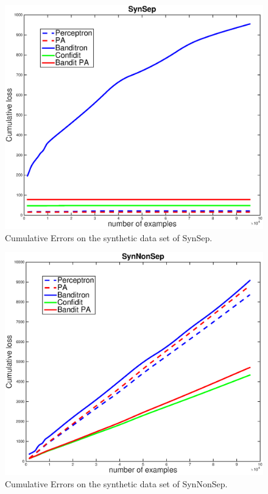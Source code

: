 \begin{figure}[h!]

\centerline{
\includegraphics[scale = 0.4]{fig05/mc/SynSep.eps}
}
\caption{Cumulative Errors on the synthetic data set of  SynSep.}
\label{pic:BPASS}
\end{figure}
\begin{figure}[h!]

\centerline{
\includegraphics[scale = 0.4]{fig05/mc/SynNonSep.eps}
}
\caption{Cumulative Errors on the synthetic data set of SynNonSep.}
\label{pic:BPASNS}
\end{figure}
